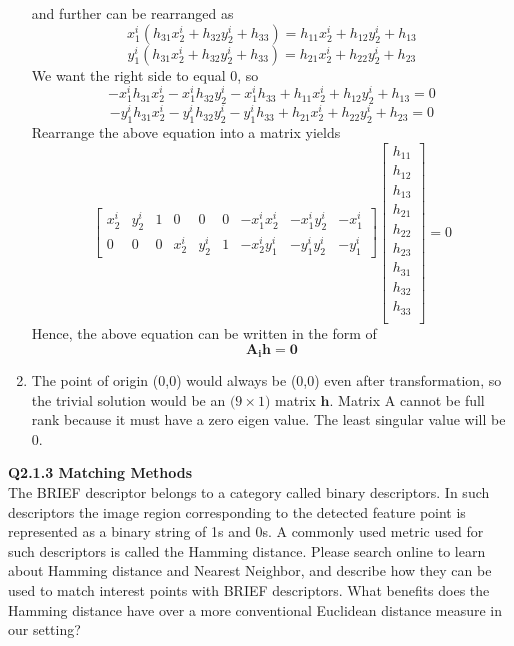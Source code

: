 \documentclass[12pt,letterpaper, onecolumn]{exam}
\begin{document}
\begin{questions}
\begin{solution}
\begin{enumerate}
\[            \]
            and further can be rearranged as
            \[
                x_1^i(h_{31}x_2^i + h_{32}y_2^i + h_{33}) = h_{11}x_2^i + h_{12}y_2^i + h_{13}
            \]
            \[
                y_1^i(h_{31}x_2^i + h_{32}y_2^i + h_{33}) = h_{21}x_2^i + h_{22}y_2^i + h_{23}
            \]
            We want the right side to equal 0, so
            \[
                - x_1^ih_{31}x_2^i - x_1^ih_{32}y_2^i - x_1^ih_{33} + h_{11}x_2^i + h_{12}y_2^i + h_{13} = 0
            \]
            \[
                - y_1^ih_{31}x_2^i - y_1^ih_{32}y_2^i - y_1^ih_{33} + h_{21}x_2^i + h_{22}y_2^i + h_{23} = 0
            \]
            Rearrange the above equation into a matrix yields
            \[
                \begin{bmatrix}
                    x_2^i & y_2^i & 1 & 0 & 0 & 0 & -x_1^i x_2^i & -x_1^iy_2^i & -x_1^i \\
                    0 & 0 & 0 & x_2^i & y_2^i & 1 & -x_2^iy_1^i & -y_1^iy_2^i & -y_1^i
                \end{bmatrix}
                \begin{bmatrix}
                    h_{11} \\
                    h_{12} \\
                    h_{13} \\
                    h_{21} \\
                    h_{22} \\
                    h_{23} \\
                    h_{31} \\
                    h_{32} \\
                    h_{33} \\
                \end{bmatrix}
                = 0
            \]
            Hence, the above equation can be written in the form of
            \[
                \mathbf{A_ih = 0}
            \]
            \item The point of origin (0,0) would always be (0,0) even after transformation, so the trivial solution would be an \(\mathbf(9 \times 1)\) matrix \(\mathbf h\). Matrix A cannot be full rank because it must have a zero eigen value. The least singular value will be 0.
        \end{enumerate}
    \end{solution}

    \pagebreak

    \question \textbf{Q2.1.3 Matching Methods} \\
    The BRIEF descriptor belongs to a category called binary descriptors. In such descriptors the image region corresponding to the detected feature point is represented as a binary string of 1s and 0s. A commonly used metric used for such descriptors is called the Hamming distance. Please search online to learn about Hamming distance and Nearest Neighbor, and describe how they can be used to match interest points with BRIEF descriptors. What benefits does the Hamming distance have over a more conventional Euclidean distance measure in our setting?


\end{questions}
\end{document}
